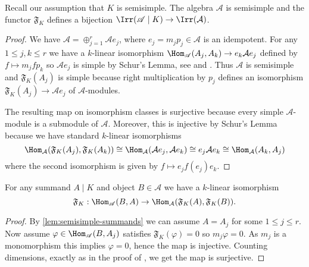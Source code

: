 \documentclass[eqthmnum,nocolour,skinny]{jt-calcs}
\begin{document}
\begin{lem}\label{lem:bij-iso-classes}
Recall our assumption that $K$ is semisimple. The algebra $\mathcal{A}$ is semisimple and the functor $\mathfrak{F}_K$ defines a bijection $\Irr(\mathscr{A}\mid K) \to \Irr(\mathcal{A})$.
\end{lem}

\begin{proof}
We have $\mathcal{A} = \oplus_{j=1}^r \mathcal{A}e_j$, where $e_j = m_jp_j \in \mathcal{A}$ is an idempotent. For any $1 \leqslant j,k\leqslant r$ we have a $k$-linear isomorphism $\Hom_{\mathscr{A}}(A_j,A_k) \to e_k\mathcal{A}e_j$ defined by $f \mapsto m_jfp_k$ so $\mathcal{A}e_j$ is simple by Schur's Lemma, see \cite[1.8.4]{etingof-gelaki-nikshych-ostrik:2015:tensor-categories} and \cite[3.18]{curtis-reiner:1981:methods-vol-I}. Thus $\mathcal{A}$ is semisimple and $\mathfrak{F}_K(A_j)$ is simple because right multiplication by $p_j$ defines an isomorphism $\mathfrak{F}_K(A_j) \to \mathcal{A}e_j$ of $\mathcal{A}$-modules.

The resulting map on isomorphism classes is surjective because every simple $\mathcal{A}$-module is a submodule of $\mathcal{A}$. Moreover, this is injective by Schur's Lemma because we have standard $k$-linear isomorphisms
\begin{equation*}
\Hom_{\mathcal{A}}(\mathfrak{F}_K(A_j),\mathfrak{F}_K(A_k)) \cong \Hom_{\mathcal{A}}(\mathcal{A}e_j,\mathcal{A}e_k) \cong e_j\mathcal{A}e_k \cong \Hom_{\mathcal{A}}(A_k,A_j)
\end{equation*}
where the second isomorphism is given by $f \mapsto e_jf(e_j)e_k$.
\end{proof}

\begin{lem}\label{lem:hom-to-end-alg}
For any summand $A \mid K$ and object $B \in \mathscr{A}$ we have a $k$-linear isomorphism
\begin{equation*}
\mathfrak{F}_K : \Hom_{\mathscr{A}}(B,A) \to \Hom_{\mathcal{A}}(\mathfrak{F}_K(A),\mathfrak{F}_K(B)).
\end{equation*}
\end{lem}

\begin{proof}
By \cref{lem:semisimple-summands} we can assume $A = A_j$ for some $1 \leqslant j \leqslant r$. Now assume $\varphi \in \Hom_{\mathscr{A}}(B,A_j)$ satisfies $\mathfrak{F}_K(\varphi) = 0$ so $m_j\varphi = 0$. As $m_j$ is a monomorphism this implies $\varphi = 0$, hence the map is injective. Counting dimensions, exactly as in the proof of \cite[4.1.2]{geck-jacon:2011:hecke-algebras}, we get the map is surjective.
\end{proof}
\end{document}
